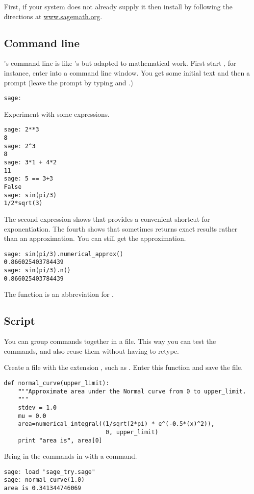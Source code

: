 First, if your system does not already supply it then install \Sage{} 
by following the directions at
\href{http://www.sagemath.org}{www.sagemath.org}.

\subsection{Command line}
\Sage's command line is like \python's but adapted to 
mathematical work.
First start \Sage,
for instance, enter  into a command line window.
You get some initial text and then a prompt
(leave the prompt by typing 
and .)
\begin{lstlisting}[style=python]
sage:  
\end{lstlisting}

Experiment with some expressions.
\begin{lstlisting}[style=python]
sage: 2**3                                                                           
8
sage: 2^3
8
sage: 3*1 + 4*2
11
sage: 5 == 3+3
False
sage: sin(pi/3)
1/2*sqrt(3)
\end{lstlisting}
The second expression 
shows that \Sage{} provides a convenient shortcut for exponentiation.
The fourth shows that \Sage{} sometimes returns exact results rather than an
approximation.
You can still get the approximation. 
\begin{lstlisting}[style=python]
sage: sin(pi/3).numerical_approx()
0.866025403784439
sage: sin(pi/3).n()
0.866025403784439  
\end{lstlisting}
The function  is an abbreviation for 
.


\subsection{Script}
You can group \Sage{} commands together in a file.
This way you can test the commands, 
and also reuse them without having to retype.

Create a file with the extension , such as .
Enter this function and save the file.
\begin{lstlisting}[style=python]
def normal_curve(upper_limit):
    """Approximate area under the Normal curve from 0 to upper_limit.
    """
    stdev = 1.0
    mu = 0.0
    area=numerical_integral((1/sqrt(2*pi) * e^(-0.5*(x)^2)),
                             0, upper_limit)    
    print "area is", area[0]
\end{lstlisting}
Bring in the commands in with a  command.
\begin{lstlisting}[style=python]
sage: load "sage_try.sage"
sage: normal_curve(1.0)   
area is 0.341344746069  
\end{lstlisting}



